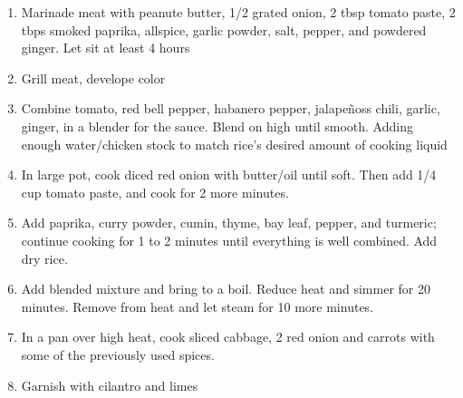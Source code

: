 \documentclass[]{report}
\begin{document}
            {\begin{enumerate}    %
                  \item  Marinade meat with peanute butter, 1/2 grated onion, 2 tbsp tomato paste, 2 tbps smoked paprika, allspice, garlic powder, salt, pepper, and powdered ginger. Let sit at least 4 hours 
                  \item Grill meat, develope color 
                  \item Combine tomato, red bell pepper, habanero pepper, jalape\~noss chili, garlic, ginger, in a blender for the sauce. Blend on high until smooth. Adding enough water/chicken stock to match rice's desired amount of cooking liquid 
                  \item In large pot, cook diced red onion with butter/oil until soft. Then add 1/4 cup tomato paste, and cook for 2 more minutes.
                  \item Add  paprika, curry powder, cumin, thyme, bay leaf, pepper, and turmeric; continue cooking for 1 to 2 minutes until everything is well combined. Add dry rice.
                  \item Add blended mixture and bring to a boil. Reduce heat and simmer for 20 minutes. Remove from heat and let steam for 10 more minutes. 
                  \item In a pan over high heat, cook sliced cabbage, 2 red onion and carrots with some of the previously used spices.
                  \item Garnish with cilantro and limes 
            \end{enumerate}}
\end{document}

